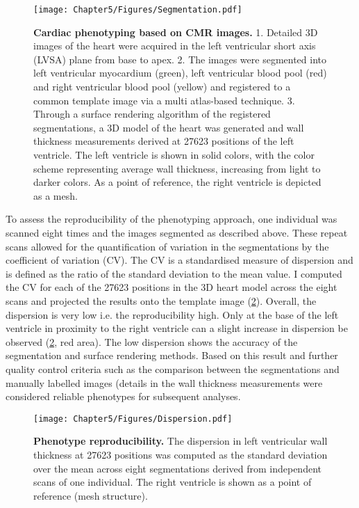 \begin{figure}[h]
	\centering
	\texttt{[image: Chapter5/Figures/Segmentation.pdf]}
	\caption[\textbf{Cardiac phenotyping based on CMR images. }]{\textbf{Cardiac phenotyping based on CMR images. }1. Detailed 3D images of the heart were acquired in the left ventricular short axis (LVSA) plane from base to apex. 2. The images were segmented into left ventricular myocardium (green), left ventricular blood pool (red) and right ventricular blood pool (yellow) and registered to a common template image via a multi atlas-based technique. 3. Through a surface rendering algorithm of the registered segmentations, a 3D model of the heart was generated and wall thickness measurements derived at \num{27623} positions of the left ventricle. The left ventricle is shown in solid colors, with the color scheme representing average wall thickness, increasing from light to darker colors. As a point of reference, the right ventricle is depicted as a mesh.}
 	\label{fig:segmentation}
\end{figure}
%
To assess the reproducibility of the phenotyping approach, one individual was scanned eight times and the images segmented as described above. These repeat scans allowed for the quantification of variation in the segmentations by the coefficient of variation (CV). The CV is a standardised measure of dispersion and is defined as the ratio of the standard deviation to the mean value. I computed the CV for each of the \num{27623} positions in the 3D heart model across the eight scans and projected the results onto the template image (\cref{fig:reproducibility}). Overall, the dispersion is very low i.e. the reproducibility high. Only at the base of the left ventricle in proximity to the right ventricle can a slight increase in dispersion be observed (\cref{fig:reproducibility}, red area). The low dispersion shows the accuracy of the segmentation and surface rendering methods. Based on this result and further quality control criteria such as the comparison between the segmentations and manually labelled images (details in \citep{deMarvao2014} the wall thickness measurements were considered reliable phenotypes for subsequent analyses. 
\\ 

\begin{figure}[h]
	\centering
	\texttt{[image: Chapter5/Figures/Dispersion.pdf]}
	\caption[\textbf{Phenotype reproducibility. }]{\textbf{Phenotype reproducibility. }The dispersion in left ventricular wall thickness at \num{27623} positions was computed as the standard deviation over the mean across eight segmentations derived from independent scans of one individual. The right ventricle is shown as a point of reference (mesh structure). }
 	\label{fig:reproducibility}
\end{figure}
%